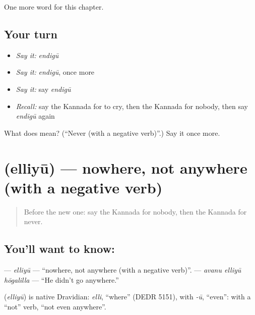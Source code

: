 \begin{grammarlens}[title={What you've built}]
One more word for this chapter.
\end{grammarlens}

\subsection*{Your turn}
\begin{itemize}
\raggedright
  \item \emph{Say it:} \emph{endigū}
  \item \emph{Say it:} \emph{endigū}, once more
  \item \emph{Say it:} say \emph{endigū}
  \item \emph{Recall:} say the Kannada for to cry, then the Kannada for nobody, then say \emph{endigū} again
\end{itemize}

\begin{tcolorbox}[breakable,colback=teal!4,colframe=teal!35!black,title={Before you move on}]
What does  mean? (\textquotedblleft{}Never (with a negative verb)\textquotedblright{}.) Say it once more.
\end{tcolorbox}
\section[\texorpdfstring{\kn{ಎಲ್ಲಿಯೂ} (elliyū)}{ಎಲ್ಲಿಯೂ (elliyū)}]{ (elliyū) — nowhere, not anywhere (with a negative verb)}

\label{lesson:KA-C154-elliyu}



\begin{quote}
Before the new one: say the Kannada for nobody, then the Kannada for never.
\end{quote}

\subsection*{You'll want to know: }
\textbf{} — \emph{elliyū} — \textquotedblleft{}nowhere, not anywhere (with a negative verb)\textquotedblright{}. \textbf{  } — \emph{avanu elliyū hōgalilla} — \textquotedblleft{}He didn't go anywhere.\textquotedblright{}

\begin{cousinweb}
\textbf{} (\emph{elliyū}) is native Dravidian: \emph{elli}, \textquotedblleft{}where\textquotedblright{} (DEDR 5151), with \emph{-ū}, \textquotedblleft{}even\textquotedblright{}: with a \textquotedblleft{}not\textquotedblright{} verb, \textquotedblleft{}not even anywhere\textquotedblright{}.
\end{cousinweb}

